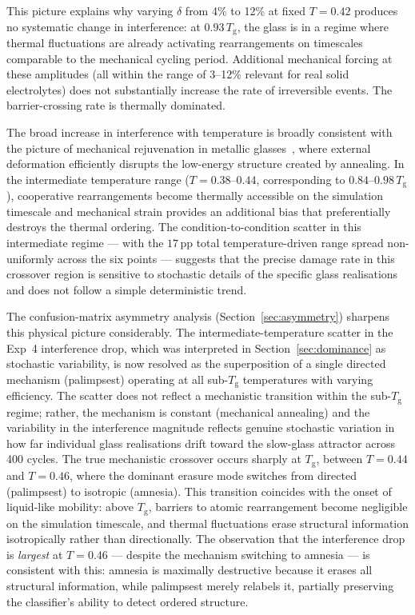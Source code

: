 \documentclass[12pt,a4paper]{article}
\newcommand{\Tg}{T_{\mathrm{g}}}
\newcommand{\degpp}{\,\text{pp}}
\begin{document}
This picture explains why varying $\delta$ from 4\% to 12\% at fixed $T = 0.42$ produces no systematic change in interference: at $0.93\,\Tg$, the glass is in a regime where thermal fluctuations are already activating rearrangements on timescales comparable to the mechanical cycling period.
Additional mechanical forcing at these amplitudes (all within the range of 3--12\% relevant for real solid electrolytes) does not substantially increase the rate of irreversible events.
The barrier-crossing rate is thermally dominated.

The broad increase in interference with temperature is broadly consistent with the picture of mechanical rejuvenation in metallic glasses~\cite{Lacks2004,Boattini2021}, where external deformation efficiently disrupts the low-energy structure created by annealing.
In the intermediate temperature range ($T = 0.38$--$0.44$, corresponding to $0.84$--$0.98\,\Tg$), cooperative rearrangements become thermally accessible on the simulation timescale and mechanical strain provides an additional bias that preferentially destroys the thermal ordering.
The condition-to-condition scatter in this intermediate regime — with the $17\degpp$ total temperature-driven range spread non-uniformly across the six points — suggests that the precise damage rate in this crossover region is sensitive to stochastic details of the specific glass realisations and does not follow a simple deterministic trend.


The confusion-matrix asymmetry analysis (Section~\ref{sec:asymmetry}) sharpens this physical picture considerably.
The intermediate-temperature scatter in the Exp~4 interference drop, which was interpreted in Section~\ref{sec:dominance} as stochastic variability, is now resolved as the superposition of a single directed mechanism (palimpsest) operating at all sub-$\Tg$ temperatures with varying efficiency.
The scatter does not reflect a mechanistic transition within the sub-$\Tg$ regime; rather, the mechanism is constant (mechanical annealing) and the variability in the interference magnitude reflects genuine stochastic variation in how far individual glass realisations drift toward the slow-glass attractor across 400 cycles.
The true mechanistic crossover occurs sharply at $\Tg$, between $T = 0.44$ and $T = 0.46$, where the dominant erasure mode switches from directed (palimpsest) to isotropic (amnesia).
This transition coincides with the onset of liquid-like mobility: above $\Tg$, barriers to atomic rearrangement become negligible on the simulation timescale, and thermal fluctuations erase structural information isotropically rather than directionally.
The observation that the interference drop is \emph{largest} at $T = 0.46$ --- despite the mechanism switching to amnesia --- is consistent with this: amnesia is maximally destructive because it erases all structural information, while palimpsest merely relabels it, partially preserving the classifier's ability to detect ordered structure.
\end{document}
